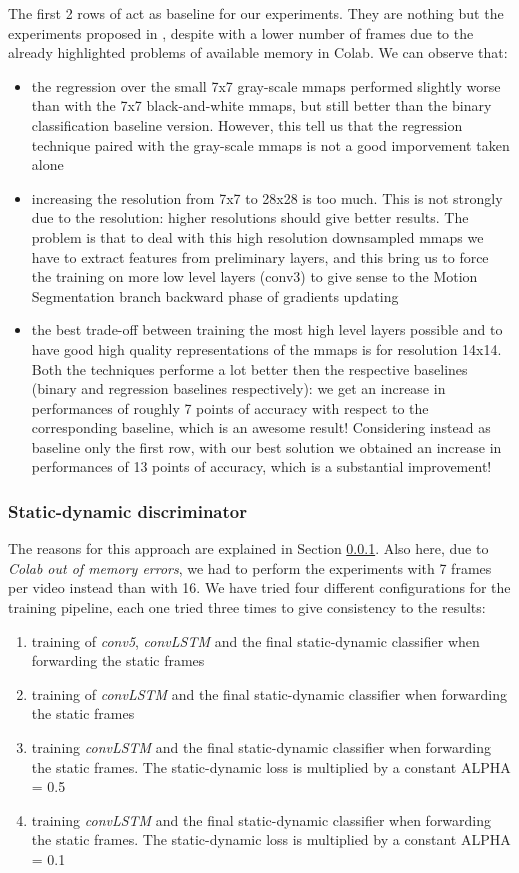 \documentclass[10pt,twocolumn,hidelinks,letterpaper]{article}
\begin{document}
The first 2 rows of  act as baseline for our experiments. They are nothing but the experiments proposed in \cite{sparnet}, despite with a lower number of frames due to the already highlighted problems of available memory in Colab. We can observe that:
\begin{itemize}
  \item the regression over the small 7x7 gray-scale mmaps performed slightly worse than with the 7x7 black-and-white mmaps, but still better than the binary classification baseline version. However, this tell us that the regression technique paired with the gray-scale mmaps is not a good imporvement taken alone
  \item increasing the resolution from 7x7 to 28x28 is too much. This is not strongly due to the resolution: higher resolutions should give better results. The problem is that to deal with this high resolution downsampled mmaps we have to extract features from preliminary layers, and this bring us to force the training on more low level layers (conv3) to give sense to the Motion Segmentation branch backward phase of gradients updating
  \item the best trade-off between training the most high level layers possible and to have good high quality representations of the mmaps is for resolution 14x14. Both the techniques performe a lot better then the respective baselines (binary and regression baselines respectively): we get an increase in performances of roughly 7 points of accuracy with respect to the corresponding baseline, which is an awesome result! Considering instead as baseline only the first row, with our best solution we obtained an increase in performances of 13 points of accuracy, which is a substantial improvement!
\end{itemize}

\subsubsection{Static-dynamic discriminator}
\label{ds_section}
The reasons for this approach are explained in Section \ref{ds_section}. Also here, due to \textit{Colab out of memory errors}, we had to perform the experiments with 7 frames per video instead than with 16. We have tried four different configurations for the training pipeline, each one tried three times to give consistency to the results:
\begin{enumerate}
  \item training of \textit{conv5}, \textit{convLSTM} and the final static-dynamic classifier when forwarding the static frames
  \item training of \textit{convLSTM} and the final static-dynamic classifier when forwarding the static frames
  \item training \textit{convLSTM} and the final static-dynamic classifier when forwarding the static frames. The static-dynamic loss is multiplied by a constant ALPHA = 0.5
  \item training \textit{convLSTM} and the final static-dynamic classifier when forwarding the static frames. The static-dynamic loss is multiplied by a constant ALPHA = 0.1
\end{enumerate}
\end{document}
